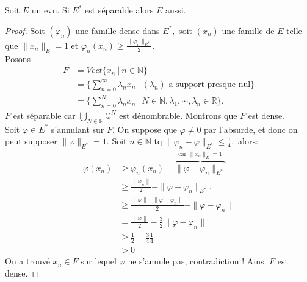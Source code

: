 \begin{ex}
    Soit $E$ un evn. Si $E^*$ est séparable alors $E$ aussi.
\end{ex}
\begin{proof}
    Soit $\left( \varphi _n \right) $ une famille dense dans $E^*,$ soit $\left( x_{n} \right) $ une famille de $E$ telle que $\|x_n\|_E=1$ et $\varphi _n(x_n)\ge \frac{\|\varphi _n\|_{E^*}}{2}$. \\
    Posons
    \begin{align*}
        F&=Vect \{x_{n}\ |\ n\in \mathbb{N} \} \\
         &= \{\sum\limits_{n=0}^{\infty} \lambda_n x_n\ |\ \left( \lambda_n \right) \text{ a support presque nul}\}\\
         &= \{\sum\limits_{n=0}^{N} \lambda_nx_n\ |\ N\in \mathbb{N} , \lambda_1,\cdots, \lambda_n\in \mathbb{R} \} .
    \end{align*}
    $F$ est séparable car $\bigcup\limits_{N\in \mathbb{N} } \mathbb{Q} ^N$ est dénombrable. Montrons que $F$ est dense.\\
    Soit $\varphi \in E^*$ s'annulant sur $F.$ On suppose que $\varphi \neq 0$ par l'absurde, et donc on peut supposer $\|\varphi \|_{E^*}=1.$ Soit $n\in \mathbb{N} $ tq $\|\varphi _n-\varphi \|_{E^*}\le \frac{1}{4},$ alors:
    \begin{align*}
        \varphi (x_n)&\ge \varphi _n(x_n) - \overbrace{\|\varphi -\varphi _n\|_{E^*}}^{\text{car } \|x_n\|_E=1}\\
                     &\ge \frac{\|\varphi _n\|}{2}-\|\varphi -\varphi _n\|_{E^*}.\\
                     &\ge \frac{\|\varphi \|-\|\varphi -\varphi _n\|}{2}-\|\varphi -\varphi _n\|\\
                     &= \frac{\|\varphi \|}{2}-\frac{3}{2}\|\varphi -\varphi _n\|\\
                     &\ge \frac{1}{2}-\frac{3}{4}\frac{1}{4}\\
                     &>0
    \end{align*}
    On a trouvé $x_{n}\in F$ sur lequel $\varphi $ ne s'annule pas, contradiction ! Ainsi $F$ est dense.
\end{proof}

